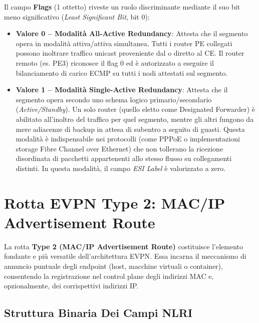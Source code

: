 \documentclass[11pt, a4paper]{article}
\begin{document}
Il campo \textbf{Flags} (1 ottetto) riveste un ruolo discriminante mediante il suo bit meno significativo (\emph{Least Significant Bit}, bit 0):
\begin{itemize}
    \item \textbf{Valore 0 -- Modalità All-Active Redundancy}:
    Attesta che il segmento opera in modalità attiva/attiva simultanea. Tutti i router PE collegati possono inoltrare traffico unicast proveniente dal o diretto al CE. Il router remoto (es. PE3) riconosce il flag $0$ ed è autorizzato a eseguire il bilanciamento di carico ECMP su tutti i nodi attestati sul segmento.
    \item \textbf{Valore 1 -- Modalità Single-Active Redundancy}:
    Attesta che il segmento opera secondo uno schema logico primario/secondario (\emph{Active/Standby}). Un solo router (quello eletto come Designated Forwarder) è abilitato all'inoltro del traffico per quel segmento, mentre gli altri fungono da mere adiacenze di backup in attesa di subentro a seguito di guasti. Questa modalità è indispensabile nei protocolli (come PPPoE o implementazioni storage Fibre Channel over Ethernet) che non tollerano la ricezione disordinata di pacchetti appartenenti allo stesso flusso su collegamenti distinti. In questa modalità, il campo \emph{ESI Label} è valorizzato a zero.
\end{itemize}


\section{Rotta EVPN Type 2: MAC/IP Advertisement Route}

La rotta \textbf{Type 2 (MAC/IP Advertisement Route)} costituisce l'elemento fondante e più versatile dell'architettura EVPN. Essa incarna il meccanismo di annuncio puntuale degli endpoint (host, macchine virtuali o container), consentendo la registrazione nel control plane degli indirizzi MAC e, opzionalmente, dei corrispettivi indirizzi IP.


\subsection{Struttura Binaria Dei Campi NLRI}
\end{document}
